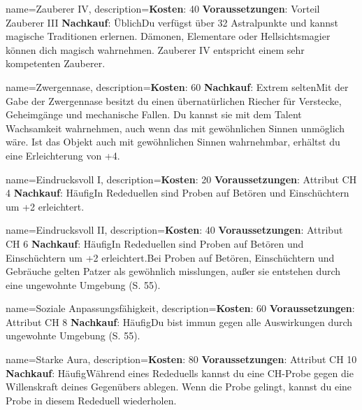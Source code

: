 {
    name={Zauberer IV},
    description={\textbf{Kosten}: 40 \textbf{Voraussetzungen}: Vorteil Zauberer III \textbf{Nachkauf}: Üblich\newline Du verfügst über 32 Astralpunkte und kannst magische Traditionen erlernen. Dämonen, Elementare oder Hellsichtsmagier können dich magisch wahrnehmen. Zauberer IV entspricht einem sehr kompetenten Zauberer.}
}


{
    name={Zwergennase},
    description={\textbf{Kosten}: 60 \textbf{Nachkauf}: Extrem selten\newline Mit der Gabe der Zwergennase besitzt du einen übernatürlichen Riecher für Verstecke, Geheimgänge und mechanische Fallen. Du kannst sie mit dem Talent Wachsamkeit wahrnehmen, auch wenn das mit gewöhnlichen Sinnen unmöglich wäre. Ist das Objekt auch mit gewöhnlichen Sinnen wahrnehmbar, erhältst du eine Erleichterung von +4.}
}


{
    name={Eindrucksvoll I},
    description={\textbf{Kosten}: 20 \textbf{Voraussetzungen}: Attribut CH 4 \textbf{Nachkauf}: Häufig\newline In Rededuellen sind Proben auf Betören und Einschüchtern um +2 erleichtert.}
}


{
    name={Eindrucksvoll II},
    description={\textbf{Kosten}: 40 \textbf{Voraussetzungen}: Attribut CH 6 \textbf{Nachkauf}: Häufig\newline In Rededuellen sind Proben auf Betören und Einschüchtern um +2 erleichtert.\newline Bei Proben auf Betören, Einschüchtern und Gebräuche gelten Patzer als gewöhnlich misslungen, außer sie entstehen durch eine ungewohnte Umgebung (S. 55).}
}


{
    name={Soziale Anpassungsfähigkeit},
    description={\textbf{Kosten}: 60 \textbf{Voraussetzungen}: Attribut CH 8 \textbf{Nachkauf}: Häufig\newline Du bist immun gegen alle Auswirkungen durch ungewohnte Umgebung (S. 55).}
}


{
    name={Starke Aura},
    description={\textbf{Kosten}: 80 \textbf{Voraussetzungen}: Attribut CH 10 \textbf{Nachkauf}: Häufig\newline Während eines Rededuells kannst du eine CH-Probe gegen die Willenskraft deines Gegenübers ablegen. Wenn die Probe gelingt, kannst du eine Probe in diesem Rededuell wiederholen.}
}


